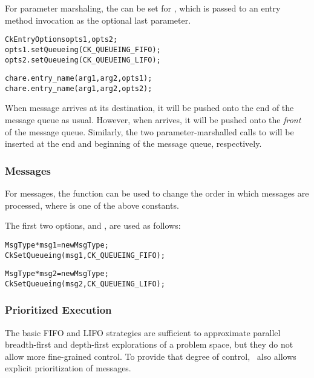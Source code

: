 For parameter marshaling, the  can be set for
, which is passed to an entry method invocation as the
optional last parameter.

\begin{alltt}
  CkEntryOptions opts1, opts2;
  opts1.setQueueing(CK_QUEUEING_FIFO);
  opts2.setQueueing(CK_QUEUEING_LIFO);

  chare.entry_name(arg1, arg2, opts1);
  chare.entry_name(arg1, arg2, opts2);
\end{alltt}

When message  arrives at its destination, it will be pushed onto the
end of the message queue as usual.  However, when  arrives, it will be
pushed onto the \emph{front} of the message queue. Similarly, the two
parameter-marshalled calls to  will be inserted at the end and
beginning of the message queue, respectively.

\subsubsection{Messages}

For messages, the  function can be used to change the order
in which messages are processed, where  is one of the above
constants.\\


\noindent The first two options,   and
, are used as follows:
%
\begin{alltt}
  MsgType *msg1 = new MsgType ;
  CkSetQueueing(msg1, CK_QUEUEING_FIFO);

  MsgType *msg2 = new MsgType ;
  CkSetQueueing(msg2, CK_QUEUEING_LIFO);
\end{alltt}

\subsubsection{Prioritized Execution}
\label{prioritized message passing}

The basic FIFO and LIFO strategies are sufficient to approximate parallel
breadth-first and depth-first explorations of a problem space, but they do not
allow more fine-grained control. To provide that degree of control, \charmpp\
also allows explicit prioritization of messages.

